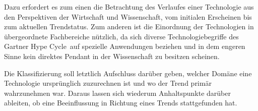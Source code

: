 Dazu erfordert es zum einen die Betrachtung des Verlaufes einer Technologie aus den Perspektiven der Wirtschaft und Wissenschaft, vom initialen Erscheinen bis zum aktuellen Trendstatus. Zum anderen ist die Einordnung der Technologien in übergeordnete Fachbereiche nützlich, da sich diverse Technologiebegriffe des \glqq Gartner Hype Cycle\grqq~auf spezielle Anwendungen beziehen und in dem engeren Sinne kein direktes Pendant in der Wissenschaft zu besitzen scheinen.

Die Klassifizierung soll letztlich Aufschluss darüber geben, welcher Domäne eine Technologie ursprünglich zuzurechnen ist und wo der Trend primär wahrzunehmen war. Daraus lassen sich wiederum Anhaltspunkte darüber ableiten, ob eine Beeinflussung in Richtung eines Trends stattgefunden hat.

